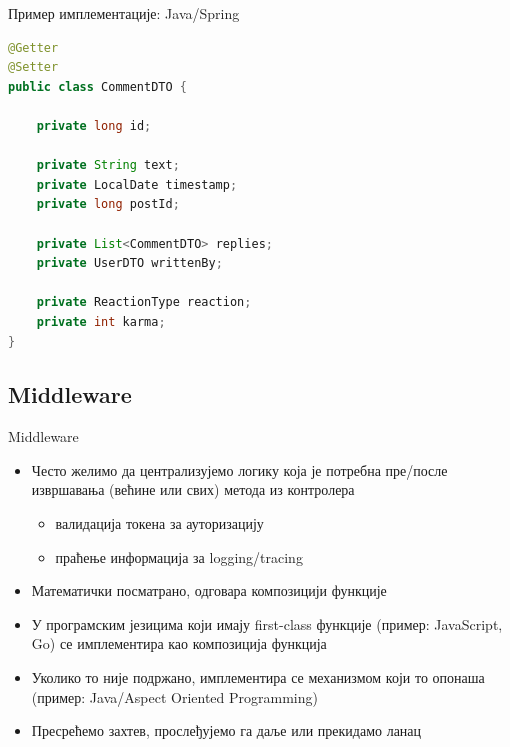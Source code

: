 \documentclass{beamer}
\begin{document}
    \begin{frame}[fragile]{Пример имплементације: Java/Spring}
        \begin{adjustbox}{width=\textwidth,height=0.7\textheight,keepaspectratio}
			\begin{lstlisting}[language=java]
@Getter
@Setter
public class CommentDTO {

    private long id;

    private String text;
    private LocalDate timestamp;
    private long postId;

    private List<CommentDTO> replies;
    private UserDTO writtenBy;

    private ReactionType reaction;
    private int karma;
}
			\end{lstlisting}
		\end{adjustbox}
    \end{frame}
    
    \subsection{Middleware}
    
    \begin{frame}{Middleware}
        \begin{itemize}
			\item Често желимо да централизујемо логику која је потребна пре/после извршавања (већине или свих) метода из контролера
			\begin{itemize}
				\item валидација токена за ауторизацију
				\item праћење информација за logging/tracing
        	\end{itemize}
			\item Математички посматрано, одговара композицији функције
			\item У програмским језицима који имају first-class функције (пример: JavaScript, Go) се имплементира као композиција функција
			\item Уколико то није подржано, имплементира се механизмом који то опонаша (пример: Java/Aspect Oriented Programming)
			\item Пресрећемо захтев, прослеђујемо га даље или прекидамо ланац
        \end{itemize}
    \end{frame}
    
\end{document}
